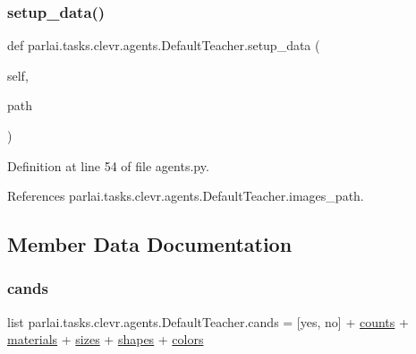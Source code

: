 \mbox{\label{classparlai_1_1tasks_1_1clevr_1_1agents_1_1DefaultTeacher_ab0f3f8e22c6a0fe921f0cae4a20864f8}} 
\subsubsection{\texorpdfstring{setup\+\_\+data()}{setup\_data()}}
{\footnotesize\ttfamily def parlai.\+tasks.\+clevr.\+agents.\+Default\+Teacher.\+setup\+\_\+data (\begin{DoxyParamCaption}\item[{}]{self,  }\item[{}]{path }\end{DoxyParamCaption})}



Definition at line 54 of file agents.\+py.



References parlai.\+tasks.\+clevr.\+agents.\+Default\+Teacher.\+images\+\_\+path.



\subsection{Member Data Documentation}
\mbox{\label{classparlai_1_1tasks_1_1clevr_1_1agents_1_1DefaultTeacher_ac6422c7d4dc173edcbafae2ce5f2552b}} 
\subsubsection{\texorpdfstring{cands}{cands}}
{\footnotesize\ttfamily list parlai.\+tasks.\+clevr.\+agents.\+Default\+Teacher.\+cands = \mbox{[}\textquotesingle{}yes\textquotesingle{}, \textquotesingle{}no\textquotesingle{}\mbox{]} + \hyperlink{namespaceparlai_1_1tasks_1_1clevr_1_1agents_addbc9f5c2379e29136fbbf55b1dfb333}{counts} + \hyperlink{namespaceparlai_1_1tasks_1_1clevr_1_1agents_a73f08794aae5cb7c2a5cc9d1d662e082}{materials} + \hyperlink{namespaceparlai_1_1tasks_1_1clevr_1_1agents_a565c7b5d57a9f93a062d7a130f6ba989}{sizes} + \hyperlink{namespaceparlai_1_1tasks_1_1clevr_1_1agents_ac54e3cd91825301baef61b929e13c0b4}{shapes} + \hyperlink{namespaceparlai_1_1tasks_1_1clevr_1_1agents_a18c5435aea4ab46265cd4c70c7f04718}{colors}\hspace{0.3cm}{\ttfamily [static]}}



